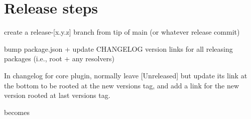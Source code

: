 \chapter{Release steps}
\hypertarget{md_pkiclassroomrescheduler_2src_2main_2frontend_2node__modules_2eslint-plugin-import_2_r_e_l_e_a_s_e}{}\label{md_pkiclassroomrescheduler_2src_2main_2frontend_2node__modules_2eslint-plugin-import_2_r_e_l_e_a_s_e}
\label{md_pkiclassroomrescheduler_2src_2main_2frontend_2node__modules_2eslint-plugin-import_2_r_e_l_e_a_s_e_autotoc_md10152}%
%

\begin{DoxyEnumerate}
\item create a {\ttfamily release-\/\mbox{[}x.\+y.\+z\mbox{]}} branch from tip of {\ttfamily main} (or whatever release commit)


\begin{DoxyCode}{0}

\end{DoxyCode}

\item bump {\ttfamily package.\+json} + update CHANGELOG version links for all releasing packages (i.\+e., root + any resolvers)

In changelog for core plugin, normally leave \mbox{[}Unreleased\mbox{]} but update its link at the bottom to be rooted at the new version\textquotesingle{}s tag, and add a link for the new version rooted at last version\textquotesingle{}s tag.


\begin{DoxyCode}{0}

\end{DoxyCode}


becomes


\begin{DoxyCode}{0}


\end{DoxyCode}
\end{DoxyEnumerate}
